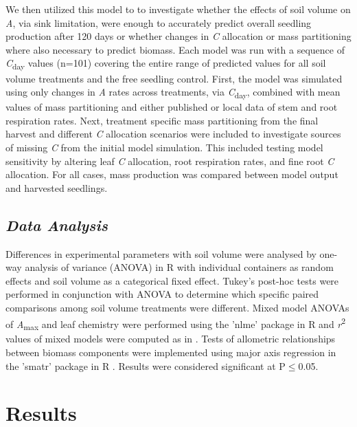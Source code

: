 \documentclass[a4paper]{article}\usepackage[]{graphicx}\usepackage[]{color}
\begin{document}
We then utilized this model to to investigate whether the effects of soil volume on \textit{A}, via sink limitation, were enough to accurately predict overall seedling production after 120 days or whether changes in \textit{C} allocation or mass partitioning where also necessary to predict biomass. Each model was run with a sequence of \textit{C}\textsubscript{day}  values (n=101) covering the entire range of predicted values for all soil volume treatments and the free seedling control. First, the model was simulated using only changes in \textit{A} rates across treatments, via \textit{C}\textsubscript{day}, combined with mean values of mass partitioning and either published or local data of stem and root respiration rates. 
Next, treatment specific mass partitioning from the final harvest and different \textit{C} allocation scenarios were included to investigate sources of missing \textit{C} from the initial model simulation. This included testing model sensitivity by altering leaf \textit{C} allocation, root respiration rates, and fine root \textit{C} allocation. For all cases, mass production was compared between model output and harvested seedlings. 

\subsection*{\textit{Data Analysis}}
Differences in experimental parameters with soil volume were analysed by one-way analysis of variance (ANOVA) in R with individual containers as random effects and soil volume as a categorical fixed effect. Tukey’s post-hoc tests were performed in conjunction with ANOVA to determine which specific paired comparisons among soil volume treatments were different. Mixed model ANOVAs of \textit{A}\textsubscript{max} and leaf chemistry were performed using the 'nlme' package \citep{nlme} in R and \textit{r}\textsuperscript{2} values of mixed models were computed as in \citet{nakagawa2013general}. Tests of allometric relationships between biomass components were implemented using major axis regression in the 'smatr' package in R \citep{warton2012smatr}. Results were considered significant at P$\leq$0.05.

\section*{Results}
\end{document}
